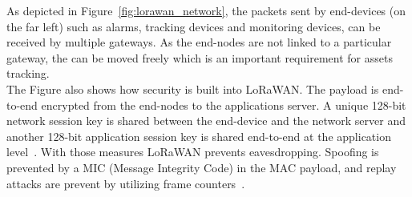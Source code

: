 As depicted in Figure~\ref{fig:lorawan_network}, the packets sent by end-devices (on the far left) such as alarms, tracking devices and monitoring devices,
can be received by multiple gateways. As the end-nodes are not linked to a particular gateway, the can be moved freely which is an important requirement for 
assets tracking.\\
The Figure also shows how security is built into LoRaWAN. The payload is end-to-end encrypted from the end-nodes to the applications server.
A unique 128-bit network session key is shared between  the end-device and the network server and 
another 128-bit application session key is shared end-to-end at the application level~\cite{about_lora_wan}.
With those measures LoRaWAN prevents eavesdropping. Spoofing is prevented by a MIC (Message Integrity Code)
in the MAC payload, and replay attacks are prevent by utilizing frame counters~\cite{lora_security}.


